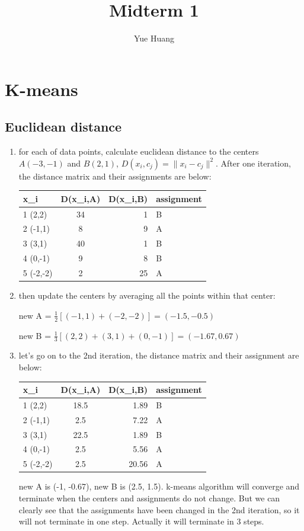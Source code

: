 \documentclass{article}
\title{Midterm 1}
\author{Yue Huang}
\begin{document}
\maketitle

\section{K-means}
\subsection{Euclidean distance}
\begin{enumerate}
\item
for each of data points, calculate euclidean distance to the centers $A (-3,-1)$ and $B(2,1)$, $D(x_i, c_j) = \|x_i - c_j\|^2$. After one iteration, the distance matrix and their assignments are below:

\medskip
\begin{tabular}{l|c|r|b}
x_i & D(x_i,A) & D(x_i,B) & assignment\\
\hline
1 (2,2)& 34 & 1 & B\\
2 (-1,1)& 8 & 9 &A\\
3 (3,1)&40&1 & B\\
4 (0,-1) &9&8 & B\\
5 (-2,-2) &2&25 & A
\end{tabular}

\item
then update the centers by averaging all the points within that center: 

new A = $\frac{1}{2} [(-1,1) + (-2,-2)] = (-1.5, -0.5)$

new B = $\frac{1}{3} [(2,2) + (3,1) + (0,-1)] = (-1.67, 0.67)$

\medskip
\item
let's go on to the 2nd iteration, the distance matrix and their assignment are below:

\medskip
\begin{tabular}{l|c|r|b}
x_i & D(x_i,A) & D(x_i,B) & assignment\\
\hline
1 (2,2)& 18.5 & 1.89 & B\\
2 (-1,1)& 2.5 & 7.22 & A\\
3 (3,1)& 22.5 & 1.89 & B\\
4 (0,-1) & 2.5 & 5.56 & A\\
5 (-2,-2) & 2.5 & 20.56 & A
\end{tabular}

\medskip
new A is (-1, -0.67), new B is (2.5, 1.5).
k-means algorithm will converge and terminate when the centers and assignments do not change. But we can clearly see that the assignments have been changed in the 2nd iteration, so it will not terminate in one step. Actually it will terminate in 3 steps.
\end{enumerate}
\end{document}
